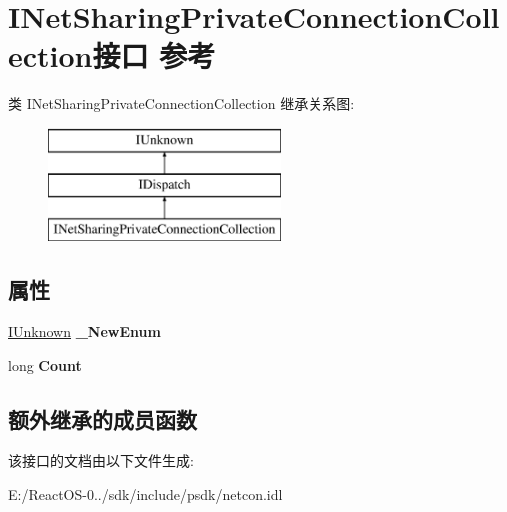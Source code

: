 \hypertarget{interface_i_net_sharing_private_connection_collection}{}\section{I\+Net\+Sharing\+Private\+Connection\+Collection接口 参考}
\label{interface_i_net_sharing_private_connection_collection}
类 I\+Net\+Sharing\+Private\+Connection\+Collection 继承关系图\+:\begin{figure}[H]
\begin{center}
\leavevmode
\includegraphics[height=3.000000cm]{interface_i_net_sharing_private_connection_collection}
\end{center}
\end{figure}
\subsection*{属性}
\begin{DoxyCompactItemize}
\item 
\mbox{\label{interface_i_net_sharing_private_connection_collection_af84afbefe67d8f7ed9728af794df317c}} 
\hyperlink{interface_i_unknown}{I\+Unknown} {\bfseries \+\_\+\+New\+Enum}
\item 
\mbox{\label{interface_i_net_sharing_private_connection_collection_a691923556f12565c52ad0e77c6374f54}} 
long {\bfseries Count}
\end{DoxyCompactItemize}
\subsection*{额外继承的成员函数}


该接口的文档由以下文件生成\+:\begin{DoxyCompactItemize}
\item 
E\+:/\+React\+O\+S-\/0../sdk/include/psdk/netcon.\+idl\end{DoxyCompactItemize}
